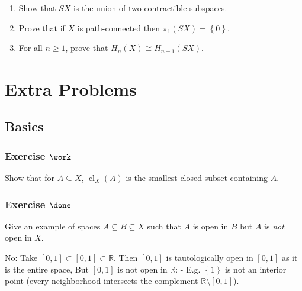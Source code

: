 \begin{enumerate}
\def\labelenumi{\alph{enumi}.}
\item
  Show that \(SX\) is the union of two contractible subspaces.
\item
  Prove that if \(X\) is path-connected then
  \(\pi_1 (SX) = \left\{{0}\right\}\).
\item
  For all \(n \geq 1\), prove that \(H_{n} (X) \cong H_{n+1} (SX)\).
\end{enumerate}

\hypertarget{extra-problems}{%
\section{Extra Problems}\label{extra-problems}}

\hypertarget{basics}{%
\subsection{Basics}\label{basics}}

\hypertarget{exercise-work}{%
\subsubsection{\texorpdfstring{Exercise
\(\work\)}{Exercise \textbackslash work}}\label{exercise-work}}

Show that for \(A\subseteq X\), \({ \operatorname{cl}} _X(A)\) is the
smallest closed subset containing \(A\).

\hypertarget{exercise-done}{%
\subsubsection{\texorpdfstring{Exercise
\(\done\)}{Exercise \textbackslash done}}\label{exercise-done}}

Give an example of spaces \(A\subseteq B \subseteq X\) such that \(A\)
is open in \(B\) but \(A\) is \emph{not} open in \(X\).

\begin{solution}

\hfill

\begin{concept}

\hfill

\end{concept}

No: Take \([0, 1] \subset [0, 1] \subset {\mathbb{R}}\). Then \([0, 1]\)
is tautologically open in \([0, 1]\) as it is the entire space, But
\([0, 1]\) is not open in \({\mathbb{R}}\): - E.g.
\(\left\{{1}\right\}\) is not an interior point (every neighborhood
intersects the complement \({\mathbb{R}}\setminus[0, 1]\)).

\end{solution}

